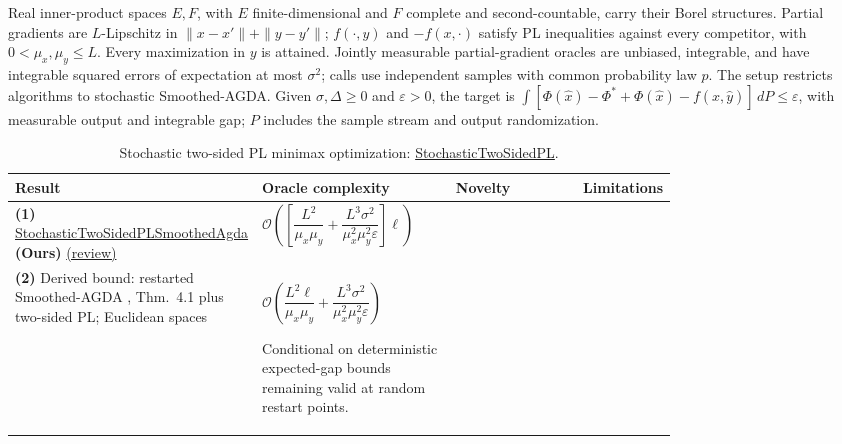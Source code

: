 \begin{table}[tp]
\centering
\caption{Stochastic two-sided PL minimax optimization: \href{https://github.com/k3nfalt/longtails/blob/main/LongTails/Setups/StochasticTwoSidedPL.lean}{StochasticTwoSidedPL}.}\label{tab:StochasticTwoSidedPL}
\parbox{\linewidth}{\footnotesize
Real inner-product spaces $E,F$, with $E$ finite-dimensional and $F$ complete and second-countable, carry their Borel structures. Partial gradients are $L$-Lipschitz in $\|x-x'\|+\|y-y'\|$; $f(\cdot,y)$ and $-f(x,\cdot)$ satisfy PL inequalities against every competitor, with $0<\mu_x,\mu_y\le L$. Every maximization in $y$ is attained. Jointly measurable partial-gradient oracles are unbiased, integrable, and have integrable squared errors of expectation at most $\sigma^2$; calls use independent samples with common probability law $p$. The setup restricts algorithms to stochastic Smoothed-AGDA. Given $\sigma,\Delta\ge0$ and $\varepsilon>0$, the target is $\int[\Phi(\hat x)-\Phi^*+\Phi(\hat x)-f(\hat x,\hat y)]\,dP\le\varepsilon$, with measurable output and integrable gap; $P$ includes the sample stream and output randomization.}\par\smallskip
\begin{threeparttable}
\footnotesize
\setlength{\tabcolsep}{4pt}\renewcommand{\arraystretch}{1.25}
\begin{tabularx}{\linewidth}{@{}>{\raggedright\arraybackslash}p{0.20\linewidth}>{\raggedright\arraybackslash}p{0.32\linewidth}>{\raggedright\arraybackslash}p{0.25\linewidth}>{\raggedright\arraybackslash}X@{}}
\toprule
\textbf{Result} & \textbf{Oracle complexity} & \textbf{Novelty} & \textbf{Limitations} \\
\midrule
\textbf{(1)} \href{https://github.com/k3nfalt/longtails/blob/main/LongTails/Theorems/StochasticTwoSidedPLSmoothedAgda.lean}{Stochastic\allowbreak Two\allowbreak Sided\allowbreak PL\allowbreak Smoothed\allowbreak Agda} \textbf{(Ours)} \href{https://github.com/k3nfalt/longtails/blob/main/scripts/reviews/StochasticTwoSidedPLSmoothedAgda.md}{(review)}
& $\mathcal{O}\!\left(\left[\dfrac{L^2}{\mu_x\mu_y}+\dfrac{L^3\sigma^2}{\mu_x^2\mu_y^2\varepsilon}\right]\ell\right)$ & & \\
\midrule[1.2pt]
\textbf{(2)} Derived bound: restarted Smoothed-AGDA \citep{stplYang2022}, Thm.~4.1 plus two-sided PL; Euclidean spaces
& $\mathcal{O}\!\left(\dfrac{L^2\ell}{\mu_x\mu_y}+\dfrac{L^3\sigma^2}{\mu_x^2\mu_y^2\varepsilon}\right)$\par Conditional on deterministic expected-gap bounds remaining valid at random restart points.

\end{tabularx}
\end{threeparttable}
\end{table}
